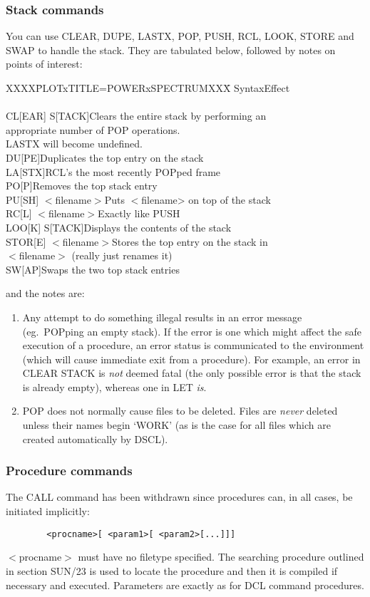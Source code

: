 \subsubsection {Stack commands}
You can use CLEAR, DUPE, LASTX, POP, PUSH, RCL, LOOK, STORE and SWAP to handle
the stack.
They are tabulated below, followed by notes on points of interest:
\begin{tabbing}
XXXX\=PLOTxTITLE=POWERxSPECTRUMXXX\=\kill
\>Syntax\>Effect\\
\\
\>CL[EAR] S[TACK]\>Clears the entire stack by  performing an\\
\>\>appropriate number of POP operations.\\
\>\>LASTX will become undefined.\\
\>DU[PE]\>Duplicates the top entry on the stack\\
\>LA[STX]\>RCL's the most recently POPped frame\\
\>PO[P]\>Removes the top stack entry\\
\>PU[SH] $<$filename$>$\>Puts $<$filename> on top of the stack\\
\>RC[L] $<$filename$>$\>Exactly like PUSH\\
\>LOO[K] S[TACK]\>Displays the contents of the stack\\
\>STOR[E] $<$filename$>$\>Stores the top entry on the stack in\\
\>\>$<$filename$>$ (really just renames it)\\
\>SW[AP]\>Swaps the two top stack entries
\end{tabbing}
and the notes are:
\begin{enumerate}
\item Any attempt to do something illegal results in an error message  (eg.\
POPping an empty stack).
If the error is one which might affect the safe execution of a procedure, an
error status is communicated to the environment (which will cause immediate
exit from a procedure).
For example, an error in CLEAR STACK is {\em not} deemed fatal (the only
possible error is that the stack is already empty), whereas one in LET {\em is}.
\item POP does not normally cause files to be deleted.
Files are {\em never} deleted unless their names begin `WORK' (as is the case
for all files which are created automatically by DSCL).
\end{enumerate}
\subsubsection {Procedure commands}
The CALL command has been withdrawn since procedures can, in all cases, be
initiated implicitly:
\begin{verbatim}
        <procname>[ <param1>[ <param2>[...]]]
\end{verbatim}
$<$procname$>$ must have no filetype specified.
The searching procedure outlined in section SUN/23 is used to locate the
procedure and then it is compiled if necessary and executed.
Parameters are exactly as for DCL command procedures.


